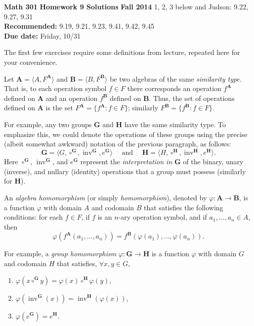 \documentclass[12pt,reqno]{amsart}
\newcommand{\bA}{\ensuremath{\mathbf{A}}}
\newcommand{\bB}{\ensuremath{\mathbf{B}}}
\newcommand{\bG}{\ensuremath{\mathbf{G}}}
\newcommand{\bH}{\ensuremath{\mathbf{H}}}
\newcommand{\invG}{\ensuremath{\operatorname{inv}^{\bG}}}
\newcommand{\invH}{\ensuremath{\operatorname{inv}^{\bH}}}
\newcommand{\<}{\ensuremath{\langle}}
\renewcommand{\>}{\ensuremath{\rangle}}
\begin{document}
\thispagestyle{empty}

\noindent \textbf{Math 301} \hskip3cm {\bf Homework 9 Solutions} \hfill {\bf Fall 2014}
\vskip1cm
 1, 2, 3 below and Judson: 9.22, 9.27, 9.31\\
{\bf Recommended:} 9.19, 9.21, 9.23, 9.41, 9.42, 9.45\\
{\bf Due date:} Friday, 10/31

\bigskip

\noindent The first few exercises require some definitions from lecture, 
repeated here for your convenience.

\vskip5mm

\noindent Let $\bA = \<A, F^{\bA}\>$ and $\bB = \<B, F^{\bB}\>$ be two algebras of the
same \emph{similarity type}.  That is, to each operation
symbol $f \in F$ there corresponds an operation $f^{\bA}$ defined on $\bA$ and an
operation $f^{\bB}$ defined on $\bB$.
Thus, the set of operations defined on $\bA$ is the set 
$F^{\bA} = \{f^{\bA} : f\in F\}$; similarly 
$F^{\bB} = \{f^{\bB} : f\in F\}$.

\vskip3mm

\noindent For example, any two groups $\bG$ and $\bH$ have the same similarity type. 
To emphasize this, we could denote the operations of these groups using
the precise (albeit somewhat awkward) notation of the previous paragraph, as follows:
\[
\bG  = \<G, \circ^{\bG}, \invG, e^{\bG}\> \quad \text{ and } \quad
\bH  = \<H, \circ^{\bH}, \invH, e^{\bH}\>.
\] 
Here $\circ^{\bG}$, $\invG$, and $e^{\bG}$ represent the \emph{interpretation
in} $\bG$ of the binary, unary (inverse), and  nullary (identity)
operations that a group must possess (similarly for $\bH$).  

\vskip5mm

\noindent An \emph{algebra homomorphism} (or simply \emph{homomorphism}), denoted by
$\varphi: \bA \rightarrow \bB$, is a function $\varphi$ with domain $A$ and
codomain $B$ that satisfies the following conditions: for each $f \in F$, if $f$
is an $n$-ary operation symbol, and if $a_1, \dots, a_n \in A$, then
\[
\varphi(f^{\bA}(a_1, \dots, a_n)) = f^{\bB}(\varphi(a_1), \dots, \varphi(a_n)).
\]

\vskip3mm

\noindent For example, a \emph{group homomorphism} $\varphi: \bG \rightarrow \bH$  is a function 
$\varphi$ with domain $G$ and codomain $H$ that satisfies, $\forall x, y \in G$,
\begin{enumerate}
\item  $\varphi(x\circ^{\bG} y) = \varphi(x) \circ^{\bH} \varphi(y)$,
\item  $\varphi(\invG(x)) = \invH(\varphi(x))$,
\item  $\varphi(e^{\bG}) = e^{\bH}$.
\end{enumerate}
\end{document}
